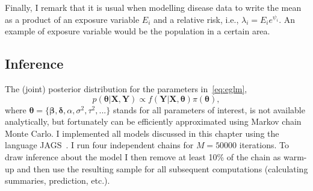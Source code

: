Finally, I remark that it is usual when modelling disease data to write the mean as a product of an exposure variable $E_i$ and a relative risk, i.e., $\lambda_i = E_i e^{\psi_i}$.
An example of exposure variable would be the population in a certain area.

\subsection{Inference}
\label{sec:mcmc_ch4}

The (joint) posterior distribution for the parameters in~\ref{eq:eglm},
\[ p(\boldsymbol\theta| \boldsymbol X, \boldsymbol Y ) \propto f(\boldsymbol Y | \boldsymbol X, \boldsymbol\theta)\pi(\boldsymbol\theta), \]
where $\boldsymbol\theta = \{ \boldsymbol\beta, \boldsymbol\delta, \alpha, \sigma^2, \tau^2, ...\}$ stands for all parameters of interest, is not available analytically, but fortunately can be efficiently approximated using Markov chain Monte Carlo.
I implemented all models discussed in this chapter using the language JAGS~\citep{Plummer2003}.
I run  four independent chains for $M=50000$ iterations.
To draw inference about the model I then remove at least 10\% of the chain as warm-up and then use the resulting sample for all subsequent computations (calculating summaries, prediction, etc.).

